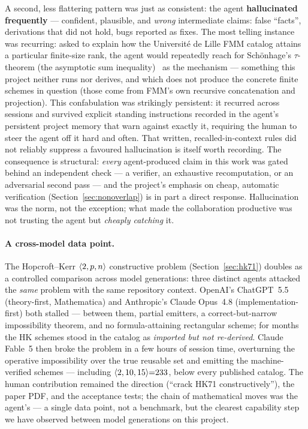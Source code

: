 A second, less flattering pattern was just as consistent: the agent
\textbf{hallucinated frequently} --- confident, plausible, and \emph{wrong}
intermediate claims: false ``facts'', derivations that did not hold, bugs
reported as fixes. The most telling instance was recurring: asked to explain
how the Universit\'e de Lille FMM catalog attains a particular finite-size
rank, the agent would repeatedly reach for Sch\"onhage's \(\tau\)-theorem (the
asymptotic sum inequality)~\cite{schonhage1981} as the mechanism --- something
this project neither runs nor derives, and which does not produce the concrete
finite schemes in question (those come from FMM's own recursive concatenation
and projection). This confabulation was strikingly persistent: it recurred
across sessions and survived explicit standing instructions recorded in the
agent's persistent project memory that warn against exactly it, requiring the
human to steer the agent off it hard and often. That written,
recalled-in-context rules did not reliably suppress a favoured hallucination is
itself worth recording. The consequence is structural: \emph{every}
agent-produced claim in this work was gated behind an independent check --- a
verifier, an exhaustive recomputation, or an adversarial second pass --- and the
project's emphasis on cheap, automatic verification
(Section~\ref{sec:nonoverlap}) is in part a direct response. Hallucination was
the norm, not the exception; what made the collaboration productive was not
trusting the agent but \emph{cheaply catching} it.

\paragraph{A cross-model data point.} The Hopcroft--Kerr
\(\langle 2, p, n \rangle\) constructive problem (Section~\ref{sec:hk71}) doubles
as a controlled comparison across model generations: three distinct agents
attacked the \emph{same} problem with the same repository context. OpenAI's
ChatGPT~5.5 (theory-first, Mathematica) and Anthropic's Claude Opus~4.8
(implementation-first) both stalled --- between them, partial emitters, a
correct-but-narrow impossibility theorem, and no formula-attaining
rectangular scheme; for months the HK schemes stood in the catalog as
\emph{imported but not re-derived}. Claude Fable~5 then broke the problem in
a few hours of session time, overturning the operative impossibility over
the true reusable set and emitting the machine-verified schemes ---
including \(\langle 2, 10, 15 \rangle{=}233\), below every published catalog. The
human contribution remained the direction (``crack HK71 constructively''),
the paper PDF, and the acceptance tests; the chain of mathematical moves was
the agent's --- a single data point, not a benchmark, but the clearest
capability step we have observed between model generations on this project.

